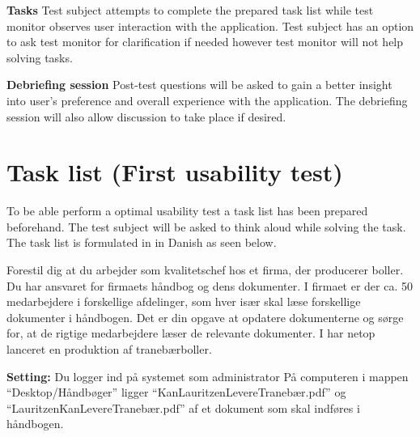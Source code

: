 \textbf{Tasks}
Test subject attempts to complete the prepared task list while test monitor observes user interaction with the application. 
Test subject has an option to ask test monitor for clarification if needed however test monitor will not help solving tasks. 

\textbf{Debriefing session}
Post-test questions will be asked to gain a better insight into user's preference and overall experience with the application. 
The debriefing session will also allow discussion to take place if desired. 

\section{Task list (First usability test)}
To be able perform a optimal usability test a task list has been prepared beforehand. 
The test subject will be asked to think aloud while solving the task.
The task list is formulated in in Danish as seen below.

Forestil dig at du arbejder som kvalitetschef hos et firma, der producerer boller. 
Du har ansvaret for firmaets håndbog og dens dokumenter. 
I firmaet er der ca. 50 medarbejdere i forskellige afdelinger, som hver især skal læse forskellige dokumenter i håndbogen. 
Det er din opgave at opdatere dokumenterne og sørge for, at de rigtige medarbejdere læser de relevante dokumenter. 
I har netop lanceret en produktion af tranebærboller.

\textbf{Setting:}
Du logger ind på systemet som administrator
På computeren i mappen “Desktop/Håndbøger” ligger “KanLauritzenLevereTranebær.pdf”  og “LauritzenKanLevereTranebær.pdf” af et dokument som skal indføres i håndbogen.

